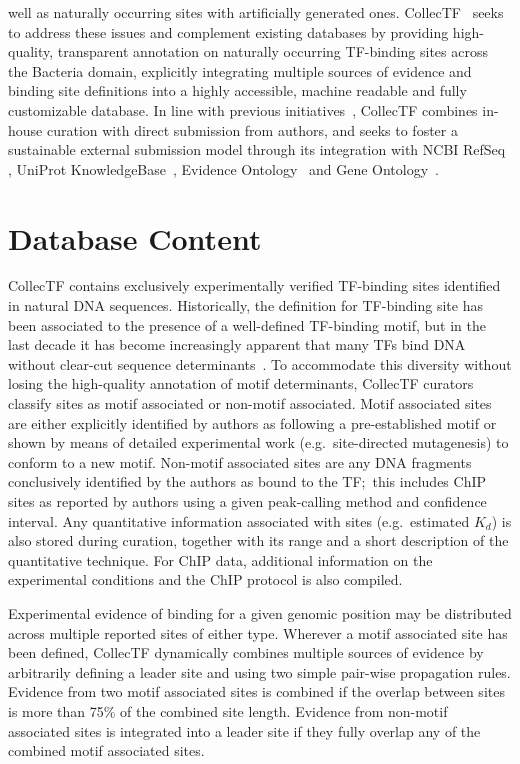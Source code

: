 well as naturally occurring sites with artificially generated
ones. CollecTF~\citep{kilic2013collectf} seeks to address these issues and
complement existing databases by providing high-quality, transparent annotation
on naturally occurring TF-binding sites across the Bacteria domain, explicitly
integrating multiple sources of evidence and binding site definitions into a
highly accessible, machine readable and fully customizable database. In line
with previous initiatives~\citep{griffith2008oreganno}, CollecTF combines
in-house curation with direct submission from authors, and seeks to foster a
sustainable external submission model through its integration with NCBI RefSeq
\citep{pruitt2007ncbi}, UniProt KnowledgeBase~\citep{uniprot2014uniprot},
Evidence Ontology~\citep{chibucos2014standardized} and Gene
Ontology~\citep{gene2004gene}.

\section{Database Content}

CollecTF contains exclusively experimentally verified TF-binding sites
identified in natural DNA sequences. Historically, the definition for
TF-binding site has been associated to the presence of a well-defined
TF-binding motif, but in the last decade it has become increasingly apparent
that many TFs bind DNA without clear-cut sequence
determinants~\citep{hijum2009mechanisms, paul2007integration,
  barnard2004regulation}. To accommodate this diversity without losing the
high-quality annotation of motif determinants, CollecTF curators classify sites
as motif associated or non-motif associated. Motif associated sites are either
explicitly identified by authors as following a pre-established motif or shown
by means of detailed experimental work (e.g.\ site-directed mutagenesis) to
conform to a new motif. Non-motif associated sites are any DNA fragments
conclusively identified by the authors as bound to the TF;\ this includes ChIP
sites as reported by authors using a given peak-calling method and confidence
interval. Any quantitative information associated with sites (e.g.\ estimated
$K_d$) is also stored during curation, together with its range and a short
description of the quantitative technique. For ChIP data, additional
information on the experimental conditions and the ChIP protocol is also
compiled.

Experimental evidence of binding for a given genomic position may be
distributed across multiple reported sites of either type. Wherever a motif
associated site has been defined, CollecTF dynamically combines multiple
sources of evidence by arbitrarily defining a leader site and using two simple
pair-wise propagation rules. Evidence from two motif associated sites is
combined if the overlap between sites is more than 75\% of the combined site
length. Evidence from non-motif associated sites is integrated into a leader
site if they fully overlap any of the combined motif associated sites.

